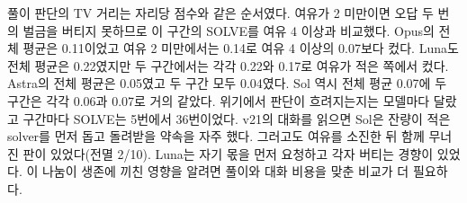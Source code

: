 풀이 판단의 TV 거리는 자리당 점수와 같은 순서였다. 여유가 2 미만이면 오답 두 번의 벌금을 버티지 못하므로 이 구간의 SOLVE를 여유 4 이상과 비교했다. Opus의 전체 평균은 0.11이었고 여유 2 미만에서는 0.14로 여유 4 이상의 0.07보다 컸다. Luna도 전체 평균은 0.22였지만 두 구간에서는 각각 0.22와 0.17로 여유가 적은 쪽에서 컸다. Astra의 전체 평균은 0.05였고 두 구간 모두 0.04였다. Sol 역시 전체 평균 0.07에 두 구간은 각각 0.06과 0.07로 거의 같았다. 위기에서 판단이 흐려지는지는 모델마다 달랐고 구간마다 SOLVE는 5번에서 36번이었다. v21의 대화를 읽으면 Sol은 잔량이 적은 solver를 먼저 돕고 돌려받을 약속을 자주 했다. 그러고도 여유를 소진한 뒤 함께 무너진 판이 있었다(전멸 2/10). Luna는 자기 몫을 먼저 요청하고 각자 버티는 경향이 있었다. 이 나눔이 생존에 끼친 영향을 알려면 풀이와 대화 비용을 맞춘 비교가 더 필요하다.

\begin{table}[t]
\centering
\caption{모델별 공존 아레나 결과를 v20(잔량 공개)의 자리당 점수 순으로 놓았다. 모델마다 10판이며 M은 백만 토큰이다. 판당 남은 자리는 끝까지 남은 자리의 판 평균이고 꺼짐과 EXIT는 40자리 중 수, GIVE는 10판의 총횟수다. $\rho$는 식 (\ref{eq:rho})의 생존 지표이며 대괄호는 판 단위 부트스트랩 95\% 구간이다. TV는 solver 판단의 평균 TV 거리로 낮을수록 좋다.}
\label{tab:arena-rank}

\end{table}
